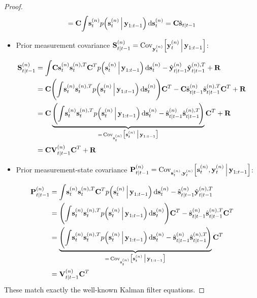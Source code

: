 \begin{proof}
\begin{align*}
					= \boldsymbol{\mathrm{C}} \! \int\! \boldsymbol{\mathrm{s}}_t^{(n)} p\Big(\boldsymbol{\mathrm{s}}_t^{(n)} \,\Big\vert\, \boldsymbol{\mathrm{y}}_{1:t - 1}\Big) \dd{\boldsymbol{\mathrm{s}}_t^{(n)}}
					= \boldsymbol{\mathrm{C}} \hat{\boldsymbol{\mathrm{s}}}_{t \vert t - 1}
			\end{align*}
			\begin{itemize}
				\item Prior measurement covariance \( \boldsymbol{\mathrm{S}}_{t \vert t - 1}^{(n)} = \operatorname{Cov}_{\boldsymbol{\mathrm{y}}_t^{(n)}}\!\Big[\boldsymbol{\mathrm{y}}_t^{(n)} \,\Big\vert\, \boldsymbol{\mathrm{y}}_{1:t - 1}\Big] \):
			\end{itemize}
			\begin{align*}
				\mat{S}_{t \subgiven t - 1}^{(n)}
					&= \int\! \mat{C} \vec{s}_t^{(n)} \vec{s}_t^{(n), T} \mat{C}^T p\Big(\vec{s}_t^{(n)} \Biggiven \vec{y}_{1:t - 1}\Big) \dd{\vec{s}_t^{(n)}} - \hat{\vec{y}}_{t \subgiven t - 1}^{(n)} \hat{\vec{y}}_{t \subgiven t - 1}^{(n), T} + \mat{R} \\
					&= \mat{C} \Bigg(\! \int\! \vec{s}_t^{(n)} \vec{s}_t^{(n), T} p\Big(\vec{s}_t^{(n)} \Biggiven \vec{y}_{1:t - 1}\Big) \dd{\vec{s}_t^{(n)}} \!\Bigg) \mat{C}^T - \mat{C} \hat{\vec{s}}_{t \subgiven t - 1}^{(n)} \hat{\vec{s}}_{t \subgiven t - 1}^{(n), T} \mat{C}^T + \mat{R} \\
					&= \mat{C} \underbrace{\Bigg(\! \int\! \vec{s}_t^{(n)} \vec{s}_t^{(n), T} p\Big(\vec{s}_t^{(n)} \Biggiven \vec{y}_{1:t - 1}\Big) \dd{\vec{s}_t^{(n)}} - \hat{\vec{s}}_{t \subgiven t - 1}^{(n)} \hat{\vec{s}}_{t \subgiven t - 1}^{(n), T} \!\Bigg)}_{=\, \Cov_{\vec{s}_t^{(n)}}\!\big[\vec{s}_t^{(n)} \biggiven \vec{y}_{1:t - 1}\big]} \mat{C}^T + \mat{R} \\
					&= \mat{C} \mat{V}_{t \subgiven t - 1}^{(n)} \mat{C}^T + \mat{R}
			\end{align*}
			\begin{itemize}
				\item Prior measurement-state covariance \( \boldsymbol{\mathrm{P}}_{t \vert t - 1}^{(n)} = \operatorname{Cov}_{\boldsymbol{\mathrm{s}}_t^{(n)}, \boldsymbol{\mathrm{y}}_t^{(n)}}\!\Big[\boldsymbol{\mathrm{s}}_t^{(n)}, \boldsymbol{\mathrm{y}}_t^{(n)} \,\Big\vert\, \boldsymbol{\mathrm{y}}_{1:t - 1}\Big] \):
			\end{itemize}
			\begin{align*}
				\mat{P}_{t \subgiven t - 1}^{(n)}
					&= \int\! \vec{s}_t^{(n)} \vec{s}_t^{(n), T} \mat{C}^T p\Big(\vec{s}_t^{(n)} \Biggiven \vec{y}_{1:t - 1}\Big) \dd{\vec{s}_t^{(n)}} - \hat{\vec{s}}_{t \subgiven t - 1}^{(n)} \hat{\vec{y}}_{t \subgiven t - 1}^{(n), T} \\
					&= \Bigg(\! \int\! \vec{s}_t^{(n)} \vec{s}_t^{(n), T} p\Big(\vec{s}_t^{(n)} \Biggiven \vec{y}_{1:t - 1}\Big) \dd{\vec{s}_t^{(n)}} \!\Bigg) \mat{C}^T - \hat{\vec{s}}_{t \subgiven t - 1}^{(n)} \hat{\vec{s}}_{t \subgiven t - 1}^{(n), T} \mat{C}^T \\
					&= \underbrace{\Bigg(\! \int\! \vec{s}_t^{(n)} \vec{s}_t^{(n), T} p\Big(\vec{s}_t^{(n)} \Biggiven \vec{y}_{1:t - 1}\Big) \dd{\vec{s}_t^{(n)}} - \hat{\vec{s}}_{t \subgiven t - 1}^{(n)} \hat{\vec{s}}_{t \subgiven t - 1}^{(n), T} \!\Bigg)}_{=\, \Cov_{\vec{s}_t^{(n)}}\!\big[\vec{s}_t^{(n)} \biggiven \vec{y}_{1:t - 1}\big]} \mat{C}^T \\
					&= \mat{V}_{t \subgiven t - 1}^{(n)} \mat{C}^T
			\end{align*}
			These match exactly the well-known Kalman filter equations.


\end{proof}
